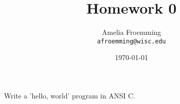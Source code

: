 \documentclass[insecs]{homework}
\title{Homework 0}
\author{Amelia Froemming \\\texttt{afroemming@wisc.edu}}
\date{\today}
\begin{document}
    \maketitle
    \makeheader

    \begin{Exercise}
        \blindtext
    \end{Exercise}
    \begin{Answer}
        \blindmathpaper
    \end{Answer}
    \begin{Exercise}
        Write a 'hello, world' program in ANSI C.
    \end{Exercise}
    \begin{Answer}
        \inputminted{c}{hello.c}
    \end{Answer}
\end{document}
